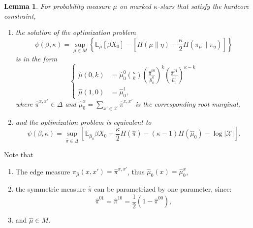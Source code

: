\documentclass[12pt]{article}
\newtheorem{lemma}[theorem]{Lemma}
\numberwithin{equation}{section}
\begin{document}
\begin{lemma}
    For probability measure $\mu$ on marked $\kappa$-stars that satisfy the hardcore constraint,
    \begin{enumerate}
        \item the solution of the optimization problem
              \begin{equation*}
                  \psi(\beta, \kappa) = \sup_{\mu\in M} \left\{\mathbb{E}_\mu\left[\beta X_0\right] - \left[H(\mu\|\eta) - \frac\kappa2 H(\pi_\mu\| \pi_\eta)\right]\right\}
              \end{equation*}
              is in the form
              \begin{equation}
                  \begin{cases}
                      \widehat{\mu}(0, k) & = \displaystyle\widehat{\mu}_0^0{\kappa\choose k}\left(\frac{\widehat{\pi}^{00}}{\widehat{\mu}_0^0}\right)^k\left(\frac{\widehat{\pi}^{01}}{\widehat{\mu}_0^0}\right)^{\kappa-k} \\
                      \widehat{\mu}(1, 0) & = \displaystyle\widehat{\mu}_0^1,
                  \end{cases}
              \end{equation}
              where $\widehat{\pi}^{x, x'}\in\Delta$ and $\widehat{\mu}_0^x = \sum_{x'\in\mathcal{X}} \widehat{\pi}^{x, x'}$ is the corresponding root marginal,
        \item and the optimization problem is equivalent to
              \begin{equation*}
                  \psi(\beta, \kappa) = \sup_{\widehat{\pi}\in\Delta}\left[ \mathbb{E}_{\widehat{\mu}_0} \beta X_0 + \frac\kappa2 H(\widehat{\pi}) - (\kappa-1) H(\widehat{\mu}_0) - \log|\mathcal{X}| \right].
                  \label{Eq.HAIS-V-tilde}
              \end{equation*}
    \end{enumerate}
\end{lemma}

Note that
\begin{enumerate}
    \item The edge measure $\pi_{\widehat{\mu}}(x, x') = \widehat{\pi}^{x, x'}$, thus $\widehat{\mu}_0(x)=\widehat{\mu}_0^x$,
    \item the symmetric measure $\widehat{\pi}$ can be parametrized by one parameter, since:
          \begin{equation}
              \widehat{\pi}^{01} = \widehat{\pi}^{10} = \frac12(1-\widehat{\pi}^{00}),
              \label{Eq.HAIS-pi-param}
          \end{equation}
    \item and $\widehat{\mu}\in M$.
\end{enumerate}
\end{document}
